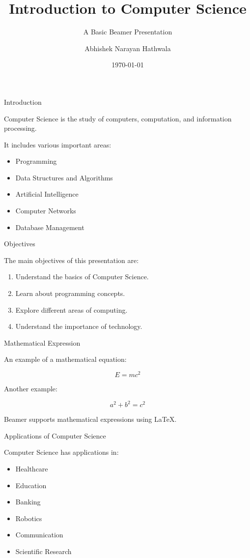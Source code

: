 \documentclass{beamer}
\title{Introduction to Computer Science}
\subtitle{A Basic Beamer Presentation}
\author{Abhishek Narayan Hathwala}
\institute{Malaviya National Institute of Technology Jaipur}
\date{\today}
\begin{document}
\begin{frame}
    \titlepage
\end{frame}

\begin{frame}{Introduction}

Computer Science is the study of computers,
computation, and information processing.

It includes various important areas:

\begin{itemize}
    \item Programming
    \item Data Structures and Algorithms
    \item Artificial Intelligence
    \item Computer Networks
    \item Database Management
\end{itemize}

\end{frame}

\begin{frame}{Objectives}

The main objectives of this presentation are:

\begin{enumerate}
    \item Understand the basics of Computer Science.
    \item Learn about programming concepts.
    \item Explore different areas of computing.
    \item Understand the importance of technology.
\end{enumerate}

\end{frame}

\begin{frame}{Mathematical Expression}

An example of a mathematical equation:

\[
E = mc^2
\]

Another example:

\[
a^2 + b^2 = c^2
\]

Beamer supports mathematical expressions using LaTeX.

\end{frame}

\begin{frame}{Applications of Computer Science}

Computer Science has applications in:

\begin{itemize}
    \item Healthcare
    \item Education
    \item Banking
    \item Robotics
    \item Communication
    \item Scientific Research
\end{itemize}

\end{frame}
\end{document}
